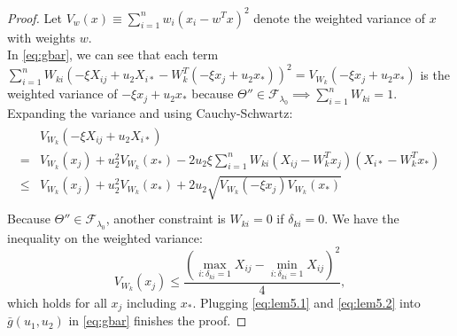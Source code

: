 \documentclass{article}
\begin{document}
\begin{proof}
    Let $V_{w}(x)\equiv\sum_{i=1}^nw_{i}\left(x_i-w^Tx\right)^2$ denote the weighted variance of $x$ with weights $w$.\\
    In \eqref{eq:gbar}, we can see that each term $\sum_{i=1}^nW_{ki}\left(-\xi X_{ij}+u_2X_{i*}-W_k^T(-\xi x_j+u_2x_*)\right)^2=V_{W_k}(-\xi x_j+u_2x_*)$ is the weighted variance of $-\xi x_j+u_2x_*$ because $\Theta''\in\mathcal{F}_{\lambda_0}\implies\sum_{i=1}^nW_{ki}=1$. Expanding the variance and using Cauchy-Schwartz:
    \begin{gather}
    \label{eq:lem5.1}
    \begin{aligned}
        &V_{W_k}\left(-\xi X_{ij}+u_2X_{i*}\right)\\
        =&V_{W_k}(x_j)+u_2^2V_{W_k}(x_*)-2u_2\xi\sum_{i=1}^nW_{ki}\left(X_{ij}-W_k^Tx_j\right)\left(X_{i*}-W_k^Tx_*\right)\\
        \leq &V_{W_k}(x_j)+u_2^2V_{W_k}(x_*)+2u_2\sqrt{V_{W_k}(-\xi x_j)V_{W_k}(x_*)}\\
    \end{aligned}
    \end{gather}
    Because $\Theta''\in\mathcal{F}_{\lambda_0}$, another constraint is $W_{ki}=0$ if $\delta_{ki}=0$. We have the inequality on the weighted variance:
    \begin{equation}
        \label{eq:lem5.2}
        V_{W_k}(x_j)\leq \frac{\left(\max_{i:\delta_{ki}=1}X_{ij}-\min_{i:\delta_{ki}=1}X_{ij}\right)^2}{4},
    \end{equation}
    which holds for all $x_j$ including $x_*$. Plugging \eqref{eq:lem5.1} and \eqref{eq:lem5.2} into $\bar{g}(u_1,u_2)$ in \eqref{eq:gbar} finishes the proof.
\end{proof}
\end{document}
